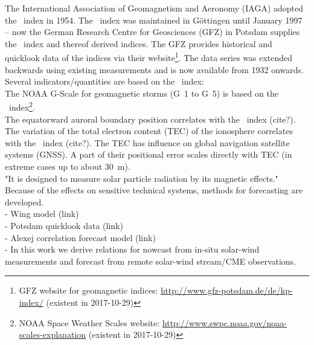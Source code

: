 The International Association of Geomagnetism and Aeronomy (IAGA) adopted the \Kp{}~index in 1954. The \Kp{}~index was maintained in Göttingen until January 1997 -- now the German Research Centre for Geosciences (GFZ) in Potsdam supplies the \Kp{}~index and thereof derived indices. The GFZ provides historical and quicklook data of the indices via their website\footnote{GFZ website for geomagnetic indices: \url{http://www.gfz-potsdam.de/de/kp-index/} (existent in 2017-10-29)}. The data series was extended backwards using existing measurements and is now available from 1932 onwards.\\

Several indicators/quantities are based on the \Kp{}~index:\\
The NOAA G-Scale for geomagnetic storms (G~1 to G~5) is based on the \Kp~index\footnote{NOAA Space Weather Scales website: \url{http://www.swpc.noaa.gov/noaa-scales-explanation} (existent in 2017-10-29)}.\\
The equatorward auroral boundary position correlates with the \Kp~index (cite?).\\
The variation of the total electron content (TEC) of the ionosphere correlates with the \Kp~index (cite?). The TEC has influence on global navigation satellite systems (GNSS). A part of their positional error scales directly with TEC (in extreme cases up to about \SI{30}{\m}).\\

"It is designed to measure solar particle radiation by its magnetic effects."\\

Because of the effects on sensitive technical systems, methods for \Kp{} forecasting are developed.\\
- Wing \Kp{} model (link)\\
- Potsdam quicklook data (link)\\
- Alexej \Kp{} correlation forecast model (link)\\
- In this work we derive relations for \Kp{} nowcast from in-situ solar-wind measurements and \Kp{} forecast from remote solar-wind stream/CME observations.\\



